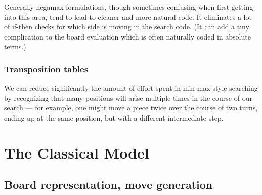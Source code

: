 \documentclass[10pt,dvipdfmx]{report}
\begin{document}
Generally negamax formulations, though sometimes confusing when first getting into
this area, tend to lead to cleaner and more natural code.  It eliminates a lot of
if-then checks for which side is moving in the search code.  (It can add a
tiny complication to the board evaluation which is often naturally coded in absolute terms.)

\begin{center}
\qquad
{}
\end{center}

\section{Transposition tables}

We can reduce significantly the amount of effort spent in min-max style searching
by recognizing that many positions will arise multiple times in the course of our
search --- for example, one might move a piece twice over the course of two turns, ending up at
the same position, but with a different intermediate step.

\part{The Classical Model}


\chapter{Board representation, move generation}
\label{chap-board-move}
\end{document}
